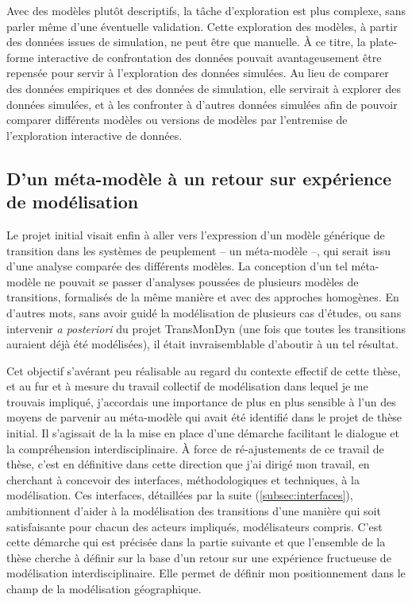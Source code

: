 Avec des modèles plutôt descriptifs, la tâche d'exploration est plus complexe, sans parler même d'une éventuelle validation.
Cette exploration des modèles, à partir des données issues de simulation, ne peut être que manuelle.
À ce titre, la plate-forme interactive de confrontation des données pouvait avantageusement être repensée pour servir à l'exploration des données simulées.
Au lieu de comparer des données empiriques et des données de simulation, elle servirait à explorer des données simulées, et à les confronter à d'autres données simulées afin de pouvoir comparer différents modèles ou versions de modèles par l'entremise de l'exploration interactive de données.

\subsection{D'un méta-modèle à un retour sur expérience de modélisation}

Le projet initial visait enfin à aller vers l'expression d'un modèle générique de transition dans les systèmes de peuplement -- un méta-modèle --, qui serait issu d'une analyse comparée des différents modèles.
La conception d'un tel méta-modèle ne pouvait se passer d'analyses poussées de plusieurs modèles de transitions, formalisés de la même manière et avec des approches homogènes.
En d'autres mots, sans avoir \og guidé\fg{} la modélisation de plusieurs cas d'études, ou sans intervenir \textit{a posteriori} du projet TransMonDyn (une fois que toutes les transitions auraient déjà été modélisées), il était invraisemblable d'aboutir à un tel résultat.

Cet objectif s'avérant peu réalisable au regard du contexte effectif de cette thèse, et au fur et à mesure du travail collectif de modélisation dans lequel je me trouvais impliqué, j'accordais une importance de plus en plus sensible à l'un des moyens de parvenir au méta-modèle qui avait été identifié dans le projet de thèse initial.
Il s'agissait de la \og la mise en place d'une démarche facilitant le dialogue et la compréhension interdisciplinaire\fg{}.
À force de ré-ajustements de ce travail de thèse, c'est en définitive dans cette direction que j'ai dirigé mon travail, en cherchant à concevoir des \og interfaces\fg{}, méthodologiques et techniques, à la modélisation.
Ces interfaces, détaillées par la suite (\cref{subsec:interfaces}), ambitionnent d'aider à la modélisation des transitions d'une manière qui soit satisfaisante pour chacun des acteurs impliqués, modélisateurs compris.
C'est cette démarche qui est précisée dans la partie suivante et que l'ensemble de la thèse cherche à définir sur la base d'un retour sur une expérience fructueuse de modélisation interdisciplinaire.
Elle permet de définir mon positionnement dans le champ de la modélisation géographique.


